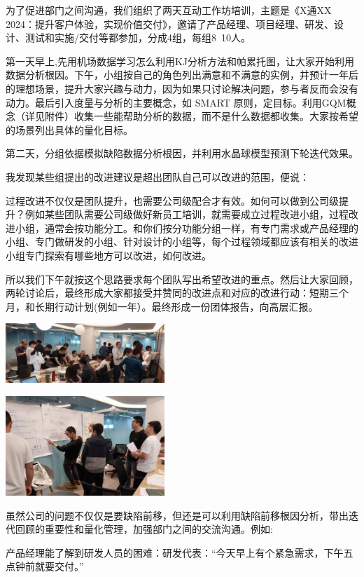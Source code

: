 为了促进部门之间沟通，我们组织了两天互动工作坊培训，主题是《X通XX 2024：提升客户体验，实现价值交付》，邀请了产品经理、项目经理、研发、设计、测试和实施/交付等都参加，分成4组，每组8~10人。

第一天早上,先用机场数据学习怎么利用KJ分析方法和帕累托图，让大家开始利用数据分析根因。下午，小组按自己的角色列出满意和不满意的实例，并预计一年后的理想场景，提升大家兴趣与动力，因为如果只讨论解决问题，参与者反而会没有动力。最后引入度量与分析的主要概念，如 SMART 原则，定目标。利用GQM概念（详见附件）收集一些能帮助分析的数据，而不是什么数据都收集。大家按希望的场景列出具体的量化目标。

第二天，分组依据模拟缺陷数据分析根因，并利用水晶球模型预测下轮迭代效果。 


我发现某些组提出的改进建议是超出团队自己可以改进的范围，便说：

过程改进不仅仅是团队提升，也需要公司级配合才有效。如何可以做到公司级提升？例如某些团队需要公司级做好新员工培训，就需要成立过程改进小组，过程改进小组，通常会按功能分工。和你们按分功能分组一样，有专门需求或产品经理的小组、专门做研发的小组、针对设计的小组等，每个过程领域都应该有相关的改进小组专门探索有哪些地方可以改进，如何改进。 


所以我们下午就按这个思路要求每个团队写出希望改进的重点。然后让大家回顾，两轮讨论后，最终形成大家都接受并赞同的改进点和对应的改进行动：短期三个月，和长期行动计划(例如一年）。最终形成一份团体报告，向高层汇报。

\includegraphics[width=6cm]{cdWS2Screenshot_2023-10-31_144622.jpg}

\includegraphics[width=6cm]{cdWS1Screenshot_2023-10-31_144121.jpg}


虽然公司的问题不仅仅是要缺陷前移，但还是可以利用缺陷前移根因分析，带出迭代回顾的重要性和量化管理，加强部门之间的交流沟通。例如:

产品经理能了解到研发人员的困难：研发代表：“今天早上有个紧急需求，下午五点钟前就要交付。”

